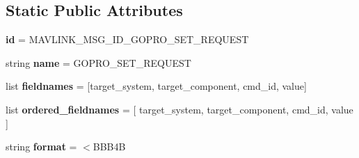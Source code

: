 \subsection*{Static Public Attributes}
\begin{DoxyCompactItemize}
\item 
\mbox{\label{classpymavlink_1_1dialects_1_1v10_1_1MAVLink__gopro__set__request__message_a90c8411f99a591a32a232cc9d48e8747}} 
{\bfseries id} = M\+A\+V\+L\+I\+N\+K\+\_\+\+M\+S\+G\+\_\+\+I\+D\+\_\+\+G\+O\+P\+R\+O\+\_\+\+S\+E\+T\+\_\+\+R\+E\+Q\+U\+E\+ST
\item 
\mbox{\label{classpymavlink_1_1dialects_1_1v10_1_1MAVLink__gopro__set__request__message_ae2b5eab3d8fab8f0a7dc232cec9dca71}} 
string {\bfseries name} = \textquotesingle{}G\+O\+P\+R\+O\+\_\+\+S\+E\+T\+\_\+\+R\+E\+Q\+U\+E\+ST\textquotesingle{}
\item 
\mbox{\label{classpymavlink_1_1dialects_1_1v10_1_1MAVLink__gopro__set__request__message_a3077d8a48073a8b7c9727e5b35824a28}} 
list {\bfseries fieldnames} = \mbox{[}\textquotesingle{}target\+\_\+system\textquotesingle{}, \textquotesingle{}target\+\_\+component\textquotesingle{}, \textquotesingle{}cmd\+\_\+id\textquotesingle{}, \textquotesingle{}value\textquotesingle{}\mbox{]}
\item 
\mbox{\label{classpymavlink_1_1dialects_1_1v10_1_1MAVLink__gopro__set__request__message_a1bc4068af3b8dd4ded4fda447546c739}} 
list {\bfseries ordered\+\_\+fieldnames} = \mbox{[} \textquotesingle{}target\+\_\+system\textquotesingle{}, \textquotesingle{}target\+\_\+component\textquotesingle{}, \textquotesingle{}cmd\+\_\+id\textquotesingle{}, \textquotesingle{}value\textquotesingle{} \mbox{]}
\item 
\mbox{\label{classpymavlink_1_1dialects_1_1v10_1_1MAVLink__gopro__set__request__message_ab4b8754453b0f40e910bd1883e43c5e4}} 
string {\bfseries format} = \textquotesingle{}$<$B\+B\+B4B\textquotesingle{}
\item 

\end{DoxyCompactItemize}
